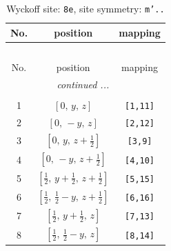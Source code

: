 \documentclass[fleqn,8pt]{jsarticle}
\begin{document}
\begin{longtable}{ccc}
\caption{Wyckoff site: {\tt 8e}, site symmetry: {\tt m'..}}
 \\
 \hline \hline
No. & position & mapping \\ \hline \endfirsthead

\multicolumn{2}{l}{\tablename\ \thetable{}} \\
 \hline \hline
No. & position & mapping \\ \hline \endhead

 \hline \hline
\multicolumn{2}{r}{\footnotesize\it continued ...} \\ \endfoot

 \hline \hline
\multicolumn{2}{r}{} \\ \endlastfoot

1 & $\left[ 0,\, y,\, z \right]$ & {\tt [1,11]} \\ \hline
2 & $\left[ 0,\, - y,\, z \right]$ & {\tt [2,12]} \\ \hline
3 & $\left[ 0,\, y,\, z + \frac{1}{2} \right]$ & {\tt [3,9]} \\ \hline
4 & $\left[ 0,\, - y,\, z + \frac{1}{2} \right]$ & {\tt [4,10]} \\ \hline
5 & $\left[ \frac{1}{2},\, y + \frac{1}{2},\, z + \frac{1}{2} \right]$ & {\tt [5,15]} \\ \hline
6 & $\left[ \frac{1}{2},\, \frac{1}{2} - y,\, z + \frac{1}{2} \right]$ & {\tt [6,16]} \\ \hline
7 & $\left[ \frac{1}{2},\, y + \frac{1}{2},\, z \right]$ & {\tt [7,13]} \\ \hline
8 & $\left[ \frac{1}{2},\, \frac{1}{2} - y,\, z \right]$ & {\tt [8,14]} \\
\end{longtable}
\renewcommand{\arraystretch}{1.2}
\end{document}
